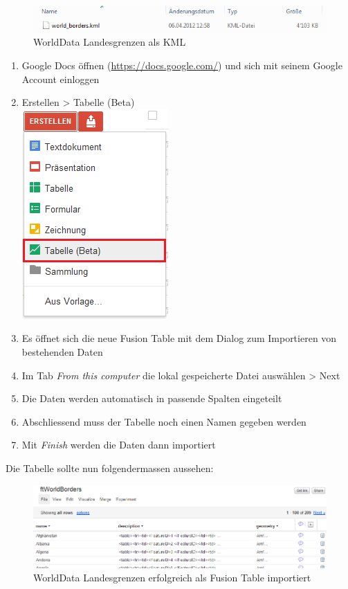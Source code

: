 \begin{figure}[htbp]
	\centering
	\includegraphics{images/usecase1-worlddata/worlddata-worldborders_kml.png}
	\caption{WorldData Landesgrenzen als KML}
	\label{worlddata-worldborders_kml}
\end{figure}

\begin{enumerate}
\item Google Docs öffnen (\url{https://docs.google.com/}) und sich mit seinem Google Account einloggen
\item Erstellen > Tabelle (Beta) \\ \includegraphics{images/usecase1-worlddata/worlddata-worldborders_import1.png}
\item Es öffnet sich die neue Fusion Table mit dem Dialog zum Importieren von bestehenden Daten
\item Im Tab \emph{From this computer} die lokal gespeicherte Datei auswählen > Next
\item Die Daten werden automatisch in passende Spalten eingeteilt
\item Abschliessend muss der Tabelle noch einen Namen gegeben werden
\item Mit \emph{Finish} werden die Daten dann importiert
\end{enumerate}

Die Tabelle sollte nun folgendermassen aussehen:

\begin{figure}[htbp]
	\centering
	\includegraphics[scale=0.65]{images/usecase1-worlddata/worlddata-worldborders_import_done.png}
	\caption{WorldData Landesgrenzen erfolgreich als Fusion Table importiert}
	\label{worlddata-worldborders_import_done}
\end{figure}

